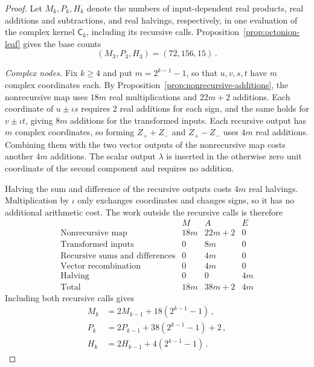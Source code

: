 \documentclass[11pt,reqno]{amsart}
\numberwithin{equation}{section}
\newcommand{\AltC}{\mathsf C}
\begin{document}
\begin{proof}
Let $M_k,P_k,H_k$ denote the numbers of input-dependent real products,
real additions and subtractions, and real halvings, respectively, in one
evaluation of the complex kernel $\AltC_k$, including its recursive
calls. Proposition~\ref{prop:octonion-leaf} gives the base counts
\[
(M_3,P_3,H_3)=(72,156,15)\,.
\]

\emph{Complex nodes.} Fix $k\ge4$ and put $m=2^{k-1}-1$, so that
$u,v,s,t$ have $m$ complex coordinates each. By
Proposition~\ref{prop:nonrecursive-additions}, the nonrecursive map uses $18m$
real
multiplications and $22m+2$ additions. Each coordinate of
$u\pm\iota s$ requires $2$ real additions for each sign, and the same
holds for $v\pm\iota t$, giving $8m$ additions for the transformed
inputs. Each recursive output has $m$ complex coordinates, so forming
$Z_++Z_-$ and $Z_+-Z_-$ uses $4m$ real additions. Combining them with
the two vector outputs of the nonrecursive map costs another $4m$ additions.
The scalar output $\lambda$ is inserted in the otherwise zero unit
coordinate of the second component and requires no addition.

Halving the sum and difference of the recursive outputs costs $4m$ real
halvings. Multiplication by $\iota$ only exchanges coordinates and
changes signs, so it has no additional arithmetic cost. The work outside
the recursive calls is therefore
\[
\begin{array}{lrrr}
 & M&A&E\\
\text{Nonrecursive map}&18m&22m+2&0\\
\text{Transformed inputs}&0&8m&0\\
\text{Recursive sums and differences}&0&4m&0\\
\text{Vector recombination}&0&4m&0\\
\text{Halving}&0&0&4m\\ \hline
\text{Total}&18m&38m+2&4m
\end{array}
\]
Including both recursive calls gives
\[
\begin{aligned}
M_k&=2M_{k-1}+18(2^{k-1}-1)\,,\\
P_k&=2P_{k-1}+38(2^{k-1}-1)+2\,,\\
H_k&=2H_{k-1}+4(2^{k-1}-1)\,.
\end{aligned}
\]


\end{proof}
\end{document}
